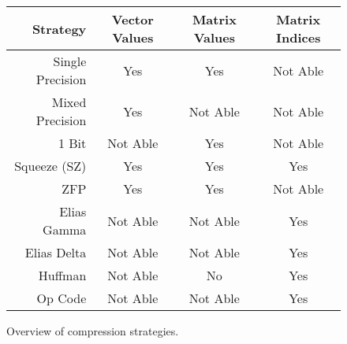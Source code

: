 \begin{figure}
	\centering
	\begin{tabular}{r| c c c}
		Strategy & Vector Values & Matrix Values & Matrix Indices \\
		\hline
		Single Precision & Yes & Yes & Not Able \\
		Mixed Precision & Yes & Not Able & Not Able \\
		1 Bit & Not Able & Yes & Not Able \\
		Squeeze (SZ) & Yes & Yes & Yes \\
		ZFP & Yes & Yes & Not Able \\
		Elias Gamma & Not Able & Not Able & Yes \\
		Elias Delta & Not Able & Not Able & Yes \\
		Huffman & Not Able & No & Yes \\
		Op Code & Not Able & Not Able & Yes
	\end{tabular}
	
	\caption{Overview of compression strategies.}
	\label{fig:comp-overview}
\end{figure}